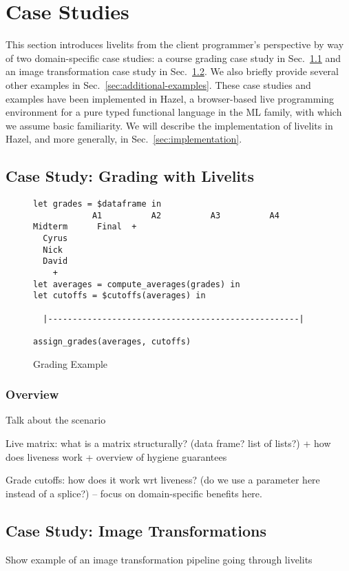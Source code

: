 \section{Case Studies}\label{sec:case-studies}
This section introduces livelits from the client programmer's perspective by way of 
two domain-specific case studies:
a course grading case study in Sec.~\ref{sec:live-grading} 
and an image transformation case study in Sec.~\ref{sec:image-transformation}. 
We also briefly provide several other examples in Sec.~\ref{sec:additional-examples}. 
These case studies and examples have been implemented
in Hazel, a browser-based live programming environment for a pure typed functional language in the
ML family, with which we assume basic familiarity. 
We will describe the implementation of livelits in Hazel, and more generally, in Sec.~\ref{sec:implementation}.

\subsection{Case Study: Grading with Livelits}\label{sec:live-grading}
\begin{figure}
\begin{lstlisting}
let grades = $dataframe in 
            A1          A2          A3          A4       Midterm      Final  +
  Cyrus
  Nick
  David
    + 
let averages = compute_averages(grades) in 
let cutoffs = $cutoffs(averages) in 

  |---------------------------------------------------|

assign_grades(averages, cutoffs)
\end{lstlisting}
\caption{Grading Example}
\label{fig:grading}
\end{figure}

\subsubsection{Overview}\label{sec:live-grading-overview}
Talk about the scenario

Live matrix: what is a matrix structurally? (data frame? list of lists?) + how does liveness work
+ overview of hygiene guarantees

Grade cutoffs: how does it work wrt liveness? (do we use a parameter here instead of a splice?) -- 
focus on domain-specific benefits here.

\subsection{Case Study: Image Transformations}\label{sec:image-transformation}
Show example of an image transformation pipeline going through livelits


